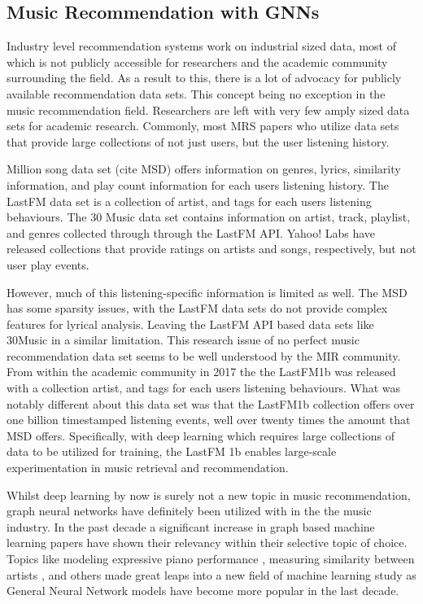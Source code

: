 \subsection{Music Recommendation with GNNs}
Industry level recommendation systems work on industrial sized data, most of which is not publicly accessible for researchers and the academic community surrounding the field. As a result to this, there is a lot of advocacy for publicly available recommendation data sets. This concept being no exception in the music recommendation field. Researchers are left with very few amply sized data sets for academic research. Commonly, most MRS papers who utilize data sets that provide large collections of not just users, but the user listening history. 

Million song data set (cite MSD) offers information on genres, lyrics, similarity information, and play count information for each users listening history. The LastFM data set is a collection of artist, and tags for each users listening behaviours. The 30 Music data set contains information on artist, track, playlist, and genres collected through through the LastFM API. Yahoo! Labs have released collections that provide ratings on artists and songs, respectively, but not user play events. 

However, much of this listening-specific information is limited as well. The MSD has some sparsity issues, with the LastFM data sets do not provide complex features for lyrical analysis. Leaving the LastFM API based data sets like 30Music in a similar limitation. This research issue of no perfect music recommendation data set seems to be well understood by the MIR community. From within the academic community in 2017 the the LastFM1b \cite{LFM1b} was released with a collection artist, and tags for each users listening behaviours. What was notably different about this data set was that the LastFM1b collection offers over one billion timestamped listening events, well over twenty times the amount that MSD offers. Specifically, with deep learning which requires large collections of data to be utilized for training, the LastFM 1b enables large-scale experimentation in music retrieval and recommendation. 

Whilst deep learning by now is surely not a new topic in music recommendation, graph neural networks have definitely been utilized with in the the music industry. In the past decade a significant increase in graph based machine learning papers have shown their relevancy within their selective topic of choice. Topics like modeling expressive piano performance \cite{jeong19}, measuring similarity between artists \cite{Oramas2021}, and others made great leaps into a new field of machine learning study as General Neural Network models have become more popular in the last decade.

